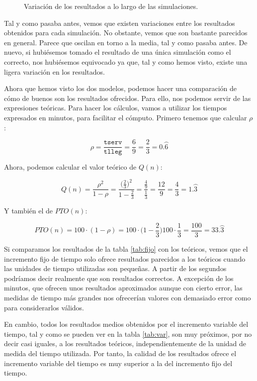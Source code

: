\documentclass[11pt,a4paper]{article}
\begin{document}
\begin{figure}[H]
	\caption{Variación de los resultados a lo largo de las simulaciones.}
	\label{fig:var}
\end{figure}

Tal y como pasaba antes, vemos que existen variaciones entre los resultados
obtenidos para cada simulación. No obstante, vemos que son bastante
parecidos en general. Parece que oscilan en torno a la media, tal y
como pasaba antes. De nuevo, si hubiésemos tomado el resultado de una única
simulación como el correcto, nos hubiésemos equivocado ya que, tal y como
hemos visto, existe una ligera variación en los resultados.

Ahora que hemos visto los dos modelos, podemos hacer una comparación de
cómo de buenos son los resultados ofrecidos. Para ello, nos podemos
servir de las expresiones teóricas. Para hacer los cálculos, vamos a utilizar
los tiempos expresados en minutos, para facilitar el cómputo. Primero
tenemos que calcular $\rho$:

\begin{equation}
	\rho = \frac{\texttt{tserv}}{\texttt{tlleg}} = \frac{6}{9} =
	\frac{2}{3} = 0.\wideparen{6}
\end{equation}

Ahora, podemos calcular el valor teórico de $Q(n)$:

\begin{equation}
	Q(n) = \frac{\rho^2}{1-\rho} = \frac{\big(\frac{2}{3}\big)^2}{1 - \frac{2}{3}} =
	\frac{\frac{4}{9}}{\frac{1}{3}} = \frac{12}{9} = \frac{4}{3} = 1.\wideparen{3}
\end{equation}

Y también el de $PTO(n)$:

\begin{equation}
	PTO(n) = 100 \cdot (1 - \rho) = 100 \cdot \Big(1 - \frac{2}{3}\Big) 
	100 \cdot \frac{1}{3} = \frac{100}{3} = 33.\wideparen{3}
\end{equation}

Si comparamos los resultados de la tabla \ref{tab:fijo} con los teóricos,
vemos que el incremento fijo de tiempo solo ofrece resultados parecidos
a los teóricos cuando las unidades de tiempo utilizadas son pequeñas.
A partir de los segundos podríamos decir realmente que son resultados correctos.
A excepción de los minutos, que ofrecen unos resultados aproximados aunque
con cierto error, las medidas de tiempo más grandes nos ofrecerían valores
con demasiado error como para considerarlos válidos.

En cambio, todos los resultados medios obtenidos por el incremento variable
del tiempo, tal y como se pueden ver en la tabla \ref{tab:var}, son muy próximos,
por no decir casi iguales, a los resultados teóricos, independientemente de
la unidad de medida del tiempo utilizada. Por tanto, la calidad de los resultados
ofrece el incremento variable del tiempo es muy superior a la del incremento fijo
del tiempo.
\end{document}
